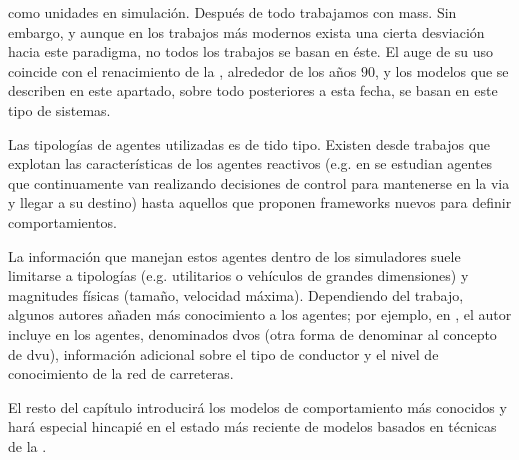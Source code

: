  como unidades en simulación. Después de todo trabajamos con \glspl{mas}. Sin embargo, y aunque en los trabajos más modernos exista una cierta desviación hacia este paradigma, no todos los trabajos se basan en éste. El auge de su uso coincide con el renacimiento de la , alrededor de los años $90$, y los modelos que se describen en este apartado, sobre todo posteriores a esta fecha, se basan en este tipo de sistemas.

Las tipologías de agentes utilizadas es de tido tipo. Existen desde trabajos que explotan las características de los agentes reactivos (e.g. en \cite{Ehlert2001} se estudian agentes que continuamente van realizando decisiones de control para mantenerse en la via y llegar a su destino) hasta aquellos que proponen frameworks nuevos para definir comportamientos.

La información que manejan estos agentes dentro de los simuladores suele limitarse a tipologías (e.g. utilitarios o vehículos de grandes dimensiones) y magnitudes físicas (tamaño, velocidad máxima). Dependiendo del trabajo, algunos autores añaden más conocimiento a los agentes; por ejemplo, en \cite{hidas2002}, el autor incluye en los agentes, denominados \glspl{dvo} (otra forma de denominar al concepto de \gls{dvu}), información adicional sobre el tipo de conductor y el nivel de conocimiento de la red de carreteras.

El resto del capítulo introducirá los modelos de comportamiento más conocidos y hará especial hincapié en el estado más reciente de modelos basados en técnicas de la .

